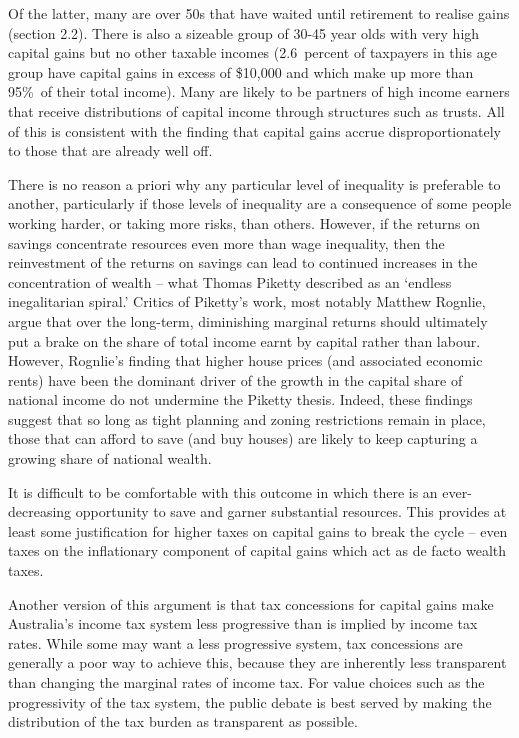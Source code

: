 \documentclass{grattan}\usepackage[]{graphicx}\usepackage[]{color}
\begin{document}
Of the latter, many are over 50s that have waited until retirement to realise gains (section 2.2). There is also a sizeable group of 30-45 year olds with very high capital gains but no other taxable incomes (2.6~percent of taxpayers in this age group have capital gains in excess of \$10,000 and which make up more than 95\%\ of their total income). Many are likely to be partners of high income earners that receive distributions of capital income through structures such as trusts. All of this is consistent with the finding that capital gains accrue disproportionately to those that are already well off. 

There is no reason a priori why any particular level of inequality is preferable to another, particularly if those levels of inequality are a consequence of some people working harder, or taking more risks, than others.  
However, if the returns on savings concentrate resources even more than wage inequality, then the reinvestment of the returns on savings can lead to continued increases in the concentration of wealth -- what Thomas Piketty described as an `endless inegalitarian spiral.'  Critics of Piketty's work, most notably Matthew Rognlie, argue that over the long-term, diminishing marginal returns should ultimately put a brake on the share of total income earnt by capital rather than labour.  However, Rognlie's finding that higher house prices (and associated economic rents) have been the dominant driver of the growth in the capital share of national income  do not undermine the Piketty thesis. Indeed, these findings suggest that so long as tight planning and zoning restrictions remain in place, those that can afford to save (and buy houses) are likely to keep capturing a growing share of national wealth.  

It is difficult to be comfortable with this outcome in which there is an ever-decreasing opportunity to save and garner substantial resources. This provides at least some justification for higher taxes on capital gains to break the cycle -- even taxes on the inflationary component of capital gains which act as de facto wealth taxes.  

Another version of this argument is that tax concessions for capital gains make Australia's income tax system less progressive than is implied by income tax rates. While some may want a less progressive system, tax concessions are generally a poor way to achieve this, because they are inherently less transparent than changing the marginal rates of income tax. For value choices such as the progressivity of the tax system, the public debate is best served by making the distribution of the tax burden as transparent as possible.
\end{document}
